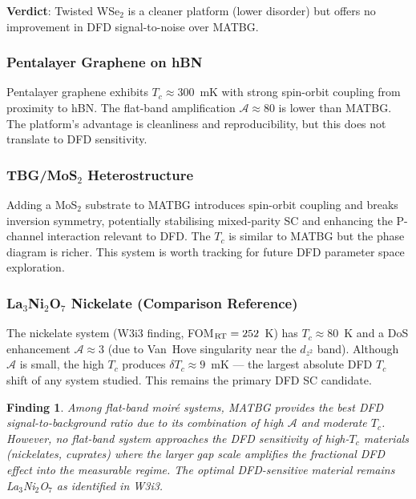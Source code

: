\documentclass[11pt]{article}
\newtheorem{finding}{Finding}
\begin{document}
\textbf{Verdict}: Twisted WSe$_2$ is a cleaner platform (lower disorder)
but offers no improvement in DFD signal-to-noise over MATBG.

\subsubsection{Pentalayer Graphene on hBN}

Pentalayer graphene exhibits $T_c \approx 300$~mK with strong spin-orbit
coupling from proximity to hBN. The flat-band amplification $\mathcal{A}
\approx 80$ is lower than MATBG. The platform's advantage is cleanliness
and reproducibility, but this does not translate to DFD sensitivity.

\subsubsection{TBG/MoS$_2$ Heterostructure}

Adding a MoS$_2$ substrate to MATBG introduces spin-orbit coupling and
breaks inversion symmetry, potentially stabilising mixed-parity SC and
enhancing the P-channel interaction relevant to DFD. The $T_c$ is similar
to MATBG but the phase diagram is richer. This system is worth tracking
for future DFD parameter space exploration.

\subsubsection{La$_3$Ni$_2$O$_7$ Nickelate (Comparison Reference)}

The nickelate system (W3i3 finding, FOM$_{\rm RT} = 252$~K) has $T_c \approx
80$~K and a DoS enhancement $\mathcal{A} \approx 3$ (due to Van~Hove
singularity near the $d_{z^2}$ band). Although $\mathcal{A}$ is small, the
high $T_c$ produces $\delta T_c \approx 9$~mK --- the largest absolute DFD
$T_c$ shift of any system studied. This remains the primary DFD SC candidate.

\begin{finding}
  \label{find:system_choice}
  Among flat-band moiré systems, MATBG provides the best DFD
  signal-to-background ratio due to its combination of high $\mathcal{A}$
  and moderate $T_c$. However, no flat-band system approaches the DFD
  sensitivity of high-$T_c$ materials (nickelates, cuprates) where the
  larger gap scale amplifies the fractional DFD effect into the measurable
  regime. The optimal DFD-sensitive material remains La$_3$Ni$_2$O$_7$
  as identified in W3i3.
\end{finding}
\end{document}
